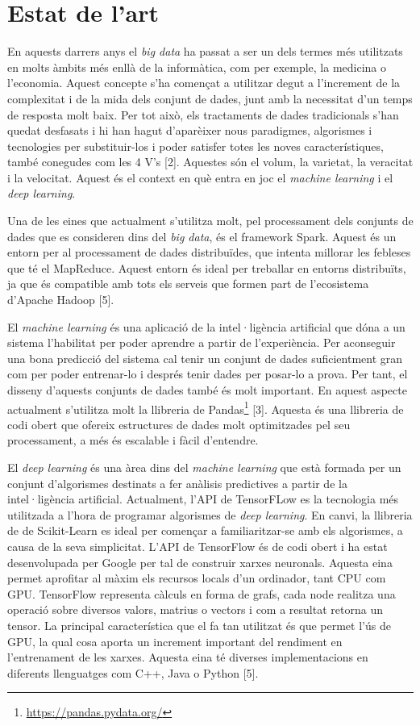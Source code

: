 \documentclass[10pt,a4paper,twocolumn,twoside]{article}
\begin{document}
\section {Estat de l'art}
En aquests darrers anys el \textit{big data} ha passat a ser un dels termes més utilitzats en molts àmbits més enllà de la informàtica, com per exemple, la medicina o l'economia. Aquest concepte s'ha començat a utilitzar degut a l'increment de la complexitat i de la mida dels conjunt de dades, junt amb la necessitat d'un temps de resposta molt baix. Per tot això, els tractaments de dades tradicionals s'han quedat desfasats i hi han hagut d'aparèixer nous paradigmes, algorismes i tecnologies per substituir-los i poder satisfer totes les noves característiques, també conegudes com les 4 V's [2]. Aquestes són el volum, la varietat, la veracitat i la velocitat. Aquest és el context en què entra en joc el \textit{machine learning} i el \textit{deep learning}. 

Una de les eines que actualment s'utilitza molt, pel processament dels conjunts de dades que es consideren dins del \textit{big data}, és el framework Spark. Aquest és un entorn per al processament de dades distribuïdes, que intenta millorar les febleses que té el MapReduce. Aquest entorn és ideal per treballar en entorns distribuïts, ja que és compatible amb tots els serveis que formen part de l'ecosistema d'Apache Hadoop [5].

El \textit{machine learning} és una aplicació de la intel·ligència artificial que dóna a un sistema l'habilitat per poder aprendre a partir de l'experiència. Per aconseguir una bona predicció del sistema cal tenir un conjunt de dades suficientment gran com per poder entrenar-lo i després tenir dades per posar-lo a prova. Per tant, el disseny d'aquests conjunts de dades també és molt important. En aquest aspecte actualment s'utilitza molt la llibreria de Pandas\footnote{\url{https://pandas.pydata.org/}} [3]. Aquesta és una llibreria de codi obert que ofereix estructures de dades molt optimitzades pel seu processament, a més és escalable i fàcil d'entendre.

El \textit{deep learning} és una àrea dins del \textit{machine learning} que està formada per un conjunt d'algorismes destinats a fer anàlisis predictives a partir de la intel·ligència artificial. Actualment, l'API de TensorFLow es la tecnologia més utilitzada a l'hora de programar algorismes de \textit{deep learning}. En canvi, la llibreria de de Scikit-Learn es ideal per començar a familiaritzar-se amb els algorismes, a causa de la seva simplicitat. L'API de TensorFlow és de codi obert i ha estat desenvolupada per Google per tal de construir xarxes neuronals. Aquesta eina permet aprofitar al màxim els recursos locals d'un ordinador, tant CPU com GPU. TensorFlow representa càlculs en forma de grafs, cada node realitza una operació sobre diversos valors, matrius o vectors i com a resultat retorna un tensor. La principal característica que el fa tan utilitzat és que permet l'ús de GPU, la qual cosa aporta un increment important del rendiment en l'entrenament de les xarxes. Aquesta eina té diverses implementacions en diferents llenguatges com C++, Java o Python [5].
\end{document}
